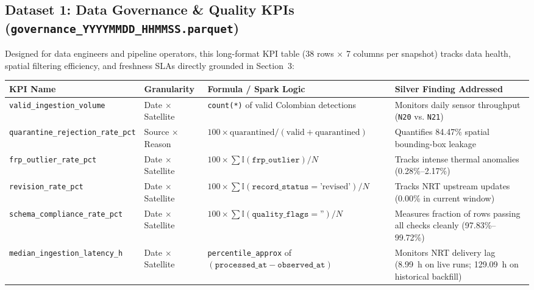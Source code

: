 \documentclass[11pt,letterpaper]{article}
\begin{document}
\subsection{Dataset 1: Data Governance \& Quality KPIs (\texttt{governance\_YYYYMMDD\_HHMMSS.parquet})}

Designed for data engineers and pipeline operators, this long-format KPI table (38 rows $\times$ 7 columns per snapshot) tracks data health, spatial filtering efficiency, and freshness SLAs directly grounded in Section~3:

\begin{table}[H]
  \centering
  \footnotesize
  \setlength{\tabcolsep}{4pt}
  \begin{tabularx}{\textwidth}{>{\raggedright\arraybackslash}p{3.8cm} >{\raggedright\arraybackslash}p{2.3cm} >{\raggedright\arraybackslash}X >{\raggedright\arraybackslash}p{3.0cm}}
    \toprule
    \textbf{KPI Name} & \textbf{Granularity} & \textbf{Formula / Spark Logic} & \textbf{Silver Finding Addressed} \\
    \midrule
    \texttt{valid\_ingestion\_volume} & Date $\times$ Satellite & \texttt{count(*)} of valid Colombian detections & Monitors daily sensor throughput (\texttt{N20} vs. \texttt{N21}) \\
    \addlinespace
    \texttt{quarantine\_rejection\_rate\_pct} & Source $\times$ Reason & $100 \times \text{quarantined} / (\text{valid} + \text{quarantined})$ & Quantifies 84.47\% spatial bounding-box leakage \\
    \addlinespace
    \texttt{frp\_outlier\_rate\_pct} & Date $\times$ Satellite & $100 \times \sum \mathbb{I}(\texttt{frp\_outlier}) / N$ & Tracks intense thermal anomalies (0.28\%--2.17\%) \\
    \addlinespace
    \texttt{revision\_rate\_pct} & Date $\times$ Satellite & $100 \times \sum \mathbb{I}(\texttt{record\_status}=\text{'revised'}) / N$ & Tracks NRT upstream updates (0.00\% in current window) \\
    \addlinespace
    \texttt{schema\_compliance\_rate\_pct} & Date $\times$ Satellite & $100 \times \sum \mathbb{I}(\texttt{quality\_flags}=\text{''}) / N$ & Measures fraction of rows passing all checks cleanly (97.83\%--99.72\%) \\
    \addlinespace
    \texttt{median\_ingestion\_latency\_h} & Date $\times$ Satellite & \texttt{percentile\_approx} of $(\texttt{processed\_at}-\texttt{observed\_at})$ & Monitors NRT delivery lag (8.99~h on live runs; 129.09~h on historical backfill) \\

\end{tabularx}
\end{table}
\end{document}

